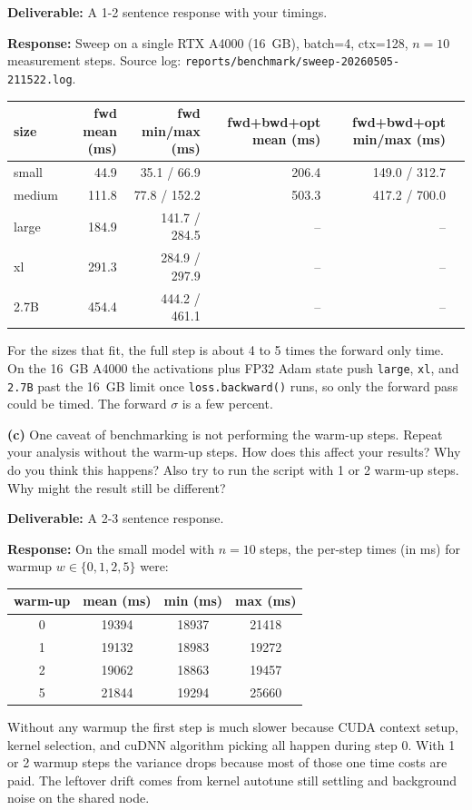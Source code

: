 \documentclass[11pt]{article}
\begin{document}
\textbf{Deliverable:} A 1-2 sentence response with your timings.

\vspace{0.25cm}
\textbf{Response:}
Sweep on a single RTX A4000 (16~GB), batch=4, ctx=128, $n=10$ measurement steps. Source log: \verb|reports/benchmark/sweep-20260505-211522.log|.

\begin{table}[H]
\centering\small
\begin{tabular}{lrrrrr}
\toprule
size & fwd mean (ms) & fwd min/max (ms) & fwd+bwd+opt mean (ms) & fwd+bwd+opt min/max (ms) \\
\midrule
small  &  44.9 &  35.1 / 66.9 & 206.4 & 149.0 / 312.7 \\
medium & 111.8 &  77.8 / 152.2 & 503.3 & 417.2 / 700.0 \\
large  & 184.9 & 141.7 / 284.5 & --   & --  \\
xl     & 291.3 & 284.9 / 297.9 & --   & --  \\
2.7B   & 454.4 & 444.2 / 461.1 & --   & --  \\
\bottomrule
\end{tabular}
\end{table}

\noindent For the sizes that fit, the full step is about 4 to 5 times the forward only time. On the 16~GB A4000 the activations plus FP32 Adam state push \texttt{large}, \texttt{xl}, and \texttt{2.7B} past the 16~GB limit once \texttt{loss.backward()} runs, so only the forward pass could be timed. The forward $\sigma$ is a few percent.

\vspace{0.25cm}
\textbf{(c)} One caveat of benchmarking is not performing the warm-up steps. Repeat your analysis without the warm-up steps. How does this affect your results? Why do you think this happens? Also try to run the script with 1 or 2 warm-up steps. Why might the result still be different?

\textbf{Deliverable:} A 2-3 sentence response.

\vspace{0.25cm}
\textbf{Response:}
On the small model with $n=10$ steps, the per-step times (in ms) for warmup $w \in \{0, 1, 2, 5\}$ were:
\begin{table}[H]
\centering\small
\begin{tabular}{cccc}
\toprule
warm-up & mean (ms) & min (ms) & max (ms) \\
\midrule
0 & 19394 & 18937 & 21418 \\
1 & 19132 & 18983 & 19272 \\
2 & 19062 & 18863 & 19457 \\
5 & 21844 & 19294 & 25660 \\
\bottomrule
\end{tabular}
\end{table}
Without any warmup the first step is much slower because CUDA context setup, kernel selection, and cuDNN algorithm picking all happen during step 0. With 1 or 2 warmup steps the variance drops because most of those one time costs are paid. The leftover drift comes from kernel autotune still settling and background noise on the shared node.
\end{document}
